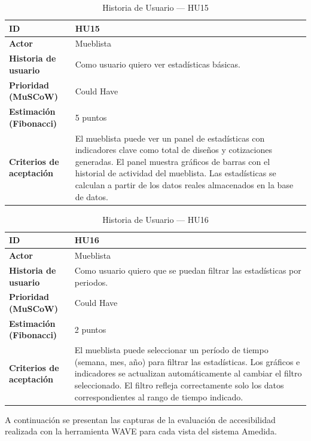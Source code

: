 ﻿\documentclass{iccmemoria}
\begin{document}
\begin{table}[H]
\centering
\caption{Historia de Usuario — HU15}
\begin{tabular}{|p{4.5cm}|p{9.5cm}|}
\hline
\textbf{ID} & HU15 \\
\hline
\textbf{Actor} & Mueblista \\
\hline
\textbf{Historia de usuario} & Como usuario quiero ver estadísticas básicas. \\
\hline
\textbf{Prioridad (MuSCoW)} & Could Have \\
\hline
\textbf{Estimación (Fibonacci)} & 5 puntos \\
\hline
\textbf{Criterios de aceptación} & El mueblista puede ver un panel de estadísticas con indicadores clave como total de diseños y cotizaciones generadas.\newline
El panel muestra gráficos de barras con el historial de actividad del mueblista.\newline
Las estadísticas se calculan a partir de los datos reales almacenados en la base de datos. \\
\hline
\end{tabular}
\end{table}

\begin{table}[H]
\centering
\caption{Historia de Usuario — HU16}
\begin{tabular}{|p{4.5cm}|p{9.5cm}|}
\hline
\textbf{ID} & HU16 \\
\hline
\textbf{Actor} & Mueblista \\
\hline
\textbf{Historia de usuario} & Como usuario quiero que se puedan filtrar las estadísticas por periodos. \\
\hline
\textbf{Prioridad (MuSCoW)} & Could Have \\
\hline
\textbf{Estimación (Fibonacci)} & 2 puntos \\
\hline
\textbf{Criterios de aceptación} & El mueblista puede seleccionar un período de tiempo (semana, mes, año) para filtrar las estadísticas.\newline
Los gráficos e indicadores se actualizan automáticamente al cambiar el filtro seleccionado.\newline
El filtro refleja correctamente solo los datos correspondientes al rango de tiempo indicado. \\
\hline
\end{tabular}
\end{table}

A continuación se presentan las capturas de la evaluación de accesibilidad realizada con la herramienta WAVE para cada vista del sistema Amedida.
\end{document}
